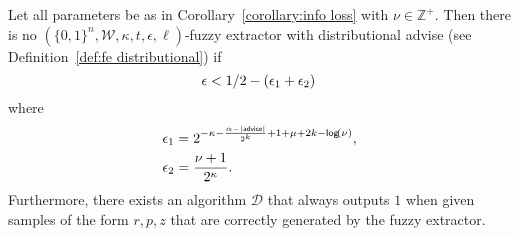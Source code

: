 \begin{lemma}
\label{lem:convert distinguisher}
Let all parameters be as in Corollary~\ref{corollary:info loss} with $\nu \in\mathbb{Z}^+$.  Then there is no $(\{0,1\}^n, \mathcal{W}, \kappa, t, \epsilon, \ell)$-fuzzy extractor with distributional advise (see Definition~\ref{def:fe distributional}) if
\[
\epsilon<1/2-\left(\epsilon_1+\epsilon_2\right)\\
\]
where 
\begin{align*}
\epsilon_1&= 2^{-\kappa-\frac{\alpha-|{\mathsf{advice}}|}{2^k}+1+\mu+2k-\mathsf{log}\!\left(\nu\right)},\\
\epsilon_2&=\frac{\nu+1}{2^{\kappa}}.
\end{align*}
Furthermore, there exists an algorithm $\mathcal{D}$ that always outputs $1$ when given samples of the form $r, p, z$ that are correctly generated by the fuzzy extractor.
\end{lemma}


